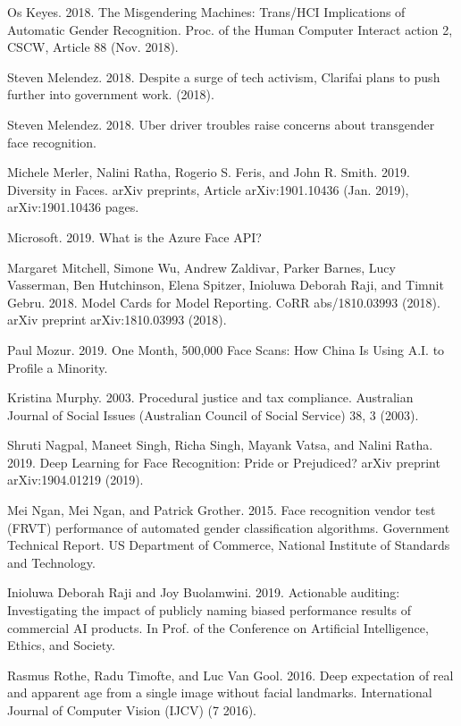 \documentclass[11pt, a4paper]{article}
\begin{document}
\begin{thebibliography}{9}
    Os Keyes. 2018. The Misgendering Machines: Trans/HCI Implications of Automatic Gender Recognition.
    Proc. of the Human Computer Interact action 2, CSCW, Article 88 (Nov. 2018).

    Steven Melendez. 2018. Despite a surge of tech activism, Clarifai plans to push
    further into government work. (2018).

    Steven Melendez. 2018. Uber driver troubles raise concerns about
    transgender face recognition.

    Michele Merler, Nalini Ratha, Rogerio S. Feris, and John R. Smith. 2019.
    Diversity in Faces. arXiv preprints, Article arXiv:1901.10436 (Jan. 2019),
    arXiv:1901.10436 pages.
    
    Microsoft. 2019. What is the Azure Face API?
    
    Margaret Mitchell, Simone Wu, Andrew Zaldivar, Parker Barnes, Lucy Vasserman,
    Ben Hutchinson, Elena Spitzer, Inioluwa Deborah Raji, and Timnit Gebru. 2018.
    Model Cards for Model Reporting. CoRR abs/1810.03993 (2018). arXiv preprint arXiv:1810.03993 (2018).
    
    Paul Mozur. 2019. One Month, 500,000 Face Scans: How China Is Using A.I. to Profile a Minority. 
    
    Kristina Murphy. 2003. Procedural justice and tax compliance. Australian Journal
    of Social Issues (Australian Council of Social Service) 38, 3 (2003).
    
    Shruti Nagpal, Maneet Singh, Richa Singh, Mayank Vatsa, and Nalini Ratha.
    2019. Deep Learning for Face Recognition: Pride or Prejudiced? arXiv preprint
    arXiv:1904.01219 (2019).
    
    Mei Ngan, Mei Ngan, and Patrick Grother. 2015. Face recognition vendor test
    (FRVT) performance of automated gender classification algorithms. Government
    Technical Report. US Department of Commerce, National Institute of Standards
    and Technology.
    
    Inioluwa Deborah Raji and Joy Buolamwini. 2019. Actionable auditing: Investigating the impact of
    publicly naming biased performance results of commercial AI products. In Prof. of the Conference
    on Artificial Intelligence, Ethics, and Society.
    
    Rasmus Rothe, Radu Timofte, and Luc Van Gool. 2016. Deep expectation of real
    and apparent age from a single image without facial landmarks. International
    Journal of Computer Vision (IJCV) (7 2016).
    

\end{thebibliography}
\end{document}
